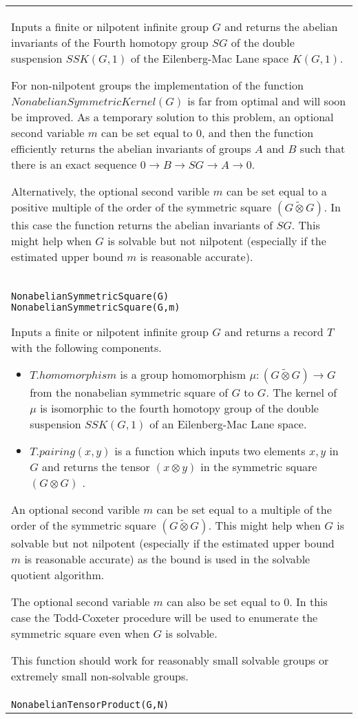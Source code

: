 \documentclass[a4paper,11pt]{report}
\begin{document}
{\begin{center}
\begin{tabular}{|l|}
 Inputs a finite or nilpotent infinite group $G$ and returns the abelian invariants of the Fourth homotopy group $SG$ of the double suspension $SSK(G,1)$ of the Eilenberg-Mac Lane space $K(G,1)$. 

 For non-nilpotent groups the implementation of the function $NonabelianSymmetricKernel(G)$ is far from optimal and will soon be improved. As a temporary solution to this
problem, an optional second variable $m$ can be set equal to $0$, and then the function efficiently returns the abelian invariants of groups $A$ and $B$ such that there is an exact sequence $0 \longrightarrow B \longrightarrow SG \longrightarrow A \longrightarrow 0$. 

 Alternatively, the optional second varible $m$ can be set equal to a positive multiple of the order of the symmetric square $(G \tilde\otimes G)$. In this case the function returns the abelian invariants of $SG$. This might help when $G$ is solvable but not nilpotent (especially if the estimated upper bound $m$ is reasonable accurate). \\
 \index{NonabelianSymmetricSquare} \texttt{NonabelianSymmetricSquare(G) } \texttt{NonabelianSymmetricSquare(G,m) } 

 Inputs a finite or nilpotent infinite group $G$ and returns a record $T$ with the following components. 
\begin{itemize}
\item  $T.homomorphism$ is a group homomorphism ${\ensuremath{\mu}} : (G \tilde\otimes G) \longrightarrow G$ from the nonabelian symmetric square of $G$ to $G$. The kernel of ${\ensuremath{\mu}}$ is isomorphic to the fourth homotopy group of the double suspension $SSK(G,1)$ of an Eilenberg-Mac Lane space. 
\item  $T.pairing(x,y)$ is a function which inputs two elements $x, y$ in $G$ and returns the tensor $(x \otimes y)$ in the symmetric square $(G \otimes G)$ . 
\end{itemize}
 An optional second varible $m$ can be set equal to a multiple of the order of the symmetric square $(G \tilde\otimes G)$. This might help when $G$ is solvable but not nilpotent (especially if the estimated upper bound $m$ is reasonable accurate) as the bound is used in the solvable quotient
algorithm. 

 The optional second variable $m$ can also be set equal to $0$. In this case the Todd-Coxeter procedure will be used to enumerate the
symmetric square even when $G$ is solvable. 

 This function should work for reasonably small solvable groups or extremely
small non-solvable groups. \\
 \index{NonabelianTensorProduct} \texttt{NonabelianTensorProduct(G,N) } 


\end{tabular}
\end{center}}
\end{document}
